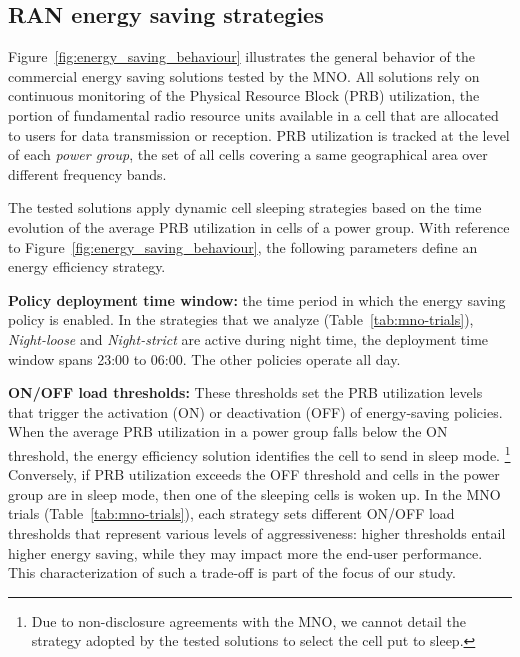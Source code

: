 \subsection{RAN energy saving strategies}
\label{subsec:background-energy-saving}
\vspace{-2pt}

Figure~\ref{fig:energy_saving_behaviour} illustrates the general behavior of the commercial energy saving solutions tested by the MNO. 
All solutions rely on continuous monitoring of the Physical Resource Block (PRB) utilization, \ie the portion of fundamental radio resource units available in a cell that are allocated to users for data transmission or reception.
PRB utilization is tracked at the level of each \textit{power group}, \ie the set of all cells covering a same geographical area over different frequency bands.

The tested solutions apply dynamic cell sleeping strategies based on the time evolution of the average PRB utilization in cells of a power group. 
With reference to Figure~\ref{fig:energy_saving_behaviour}, the following parameters define an energy efficiency strategy.


\textbf{Policy deployment time window:} the time period in which the energy saving policy is enabled. In the strategies that we analyze (Table~\ref{tab:mno-trials}), \textit{Night-loose} and \textit{Night-strict} are active during night time, \ie the deployment time window spans 23:00 to 06:00. The other policies operate all day.

\textbf{ON/OFF load thresholds:} These thresholds set the PRB utilization levels that trigger the activation (ON) or deactivation (OFF) of energy-saving policies. When the average PRB utilization in a power group falls below the ON threshold, the energy efficiency solution identifies the cell to send in sleep mode.%
\footnote{Due to non-disclosure agreements with the MNO, we cannot detail the strategy adopted by the tested solutions to select the cell put to sleep.}
Conversely, if PRB utilization exceeds the OFF threshold and cells in the power group are in sleep mode, then one of the sleeping cells is woken up. In the MNO trials (Table~\ref{tab:mno-trials}), each strategy sets different ON/OFF load thresholds that represent various levels of aggressiveness: higher thresholds entail higher energy saving, while they may impact more the end-user performance. This characterization of such a trade-off is part of the focus of our study.

